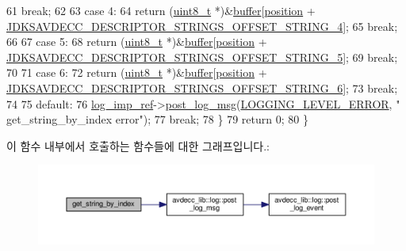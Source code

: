 \begin{DoxyCode}
61         \textcolor{keywordflow}{break};
62 
63     \textcolor{keywordflow}{case} 4:
64         \textcolor{keywordflow}{return} (\hyperlink{stdint_8h_aba7bc1797add20fe3efdf37ced1182c5}{uint8\_t} *)&\hyperlink{classavdecc__lib_1_1descriptor__response__base__imp_a56ed84df35de10bdb65e72b184309497}{buffer}[\hyperlink{classavdecc__lib_1_1descriptor__response__base__imp_a7a04afe5347934be732ec70a70bd0a28}{position} + 
      \hyperlink{group__descriptor__strings_ga14a1e954234814b95c851713024e54be}{JDKSAVDECC\_DESCRIPTOR\_STRINGS\_OFFSET\_STRING\_4}];
65         \textcolor{keywordflow}{break};
66 
67     \textcolor{keywordflow}{case} 5:
68         \textcolor{keywordflow}{return} (\hyperlink{stdint_8h_aba7bc1797add20fe3efdf37ced1182c5}{uint8\_t} *)&\hyperlink{classavdecc__lib_1_1descriptor__response__base__imp_a56ed84df35de10bdb65e72b184309497}{buffer}[\hyperlink{classavdecc__lib_1_1descriptor__response__base__imp_a7a04afe5347934be732ec70a70bd0a28}{position} + 
      \hyperlink{group__descriptor__strings_ga7452da8765c20c1f989387e87405884b}{JDKSAVDECC\_DESCRIPTOR\_STRINGS\_OFFSET\_STRING\_5}];
69         \textcolor{keywordflow}{break};
70 
71     \textcolor{keywordflow}{case} 6:
72         \textcolor{keywordflow}{return} (\hyperlink{stdint_8h_aba7bc1797add20fe3efdf37ced1182c5}{uint8\_t} *)&\hyperlink{classavdecc__lib_1_1descriptor__response__base__imp_a56ed84df35de10bdb65e72b184309497}{buffer}[\hyperlink{classavdecc__lib_1_1descriptor__response__base__imp_a7a04afe5347934be732ec70a70bd0a28}{position} + 
      \hyperlink{group__descriptor__strings_gae31e4c4768feeaf8602908c8f7a05cd3}{JDKSAVDECC\_DESCRIPTOR\_STRINGS\_OFFSET\_STRING\_6}];
73         \textcolor{keywordflow}{break};
74 
75     \textcolor{keywordflow}{default}:
76         \hyperlink{namespaceavdecc__lib_acbe3e2a96ae6524943ca532c87a28529}{log\_imp\_ref}->\hyperlink{classavdecc__lib_1_1log_a68139a6297697e4ccebf36ccfd02e44a}{post\_log\_msg}(\hyperlink{namespaceavdecc__lib_a501055c431e6872ef46f252ad13f85cdaf2c4481208273451a6f5c7bb9770ec8a}{LOGGING\_LEVEL\_ERROR}, \textcolor{stringliteral}{"
      get\_string\_by\_index error"});
77         \textcolor{keywordflow}{break};
78     \}
79     \textcolor{keywordflow}{return} 0;
80 \}
\end{DoxyCode}


이 함수 내부에서 호출하는 함수들에 대한 그래프입니다.\+:
\nopagebreak
\begin{figure}[H]
\begin{center}
\leavevmode
\includegraphics[width=350pt]{classavdecc__lib_1_1strings__descriptor__response__imp_ad106ef09d794e7fb8b344e6f17b1f44a_cgraph}
\end{center}
\end{figure}


